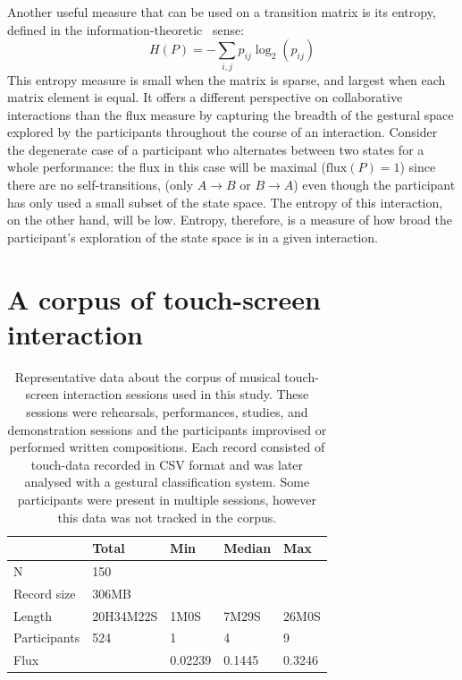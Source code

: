 \documentclass{sigchi}
\begin{document}
Another useful measure that can be used on a transition matrix is its
entropy, defined in the information-theoretic~\cite{Shannon:1948rt}
sense:
\begin{equation}
  H(P) = -\sum_{i,j}p_{ij}\log_2(p_{ij})
\end{equation}
This entropy measure is small when the matrix is sparse, and largest
when each matrix element is equal. It offers a different perspective
on collaborative interactions than the flux measure by capturing the
breadth of the gestural space explored by the participants throughout
the course of an interaction. Consider the degenerate case of a
participant who alternates between two states for a whole performance:
the flux in this case will be maximal ($\mathrm{flux}(P) = 1$) since
there are no self-transitions, (only $A \rightarrow B$ or
$ B \rightarrow A$) even though the participant has only used a small
subset of the state space. The entropy of this interaction, on the
other hand, will be low. Entropy, therefore, is a measure of how broad
the participant's exploration of the state space is in a given
interaction.

\section{A corpus of touch-screen interaction}

\begin{table}
\begin{tabular}{l|llll}
\hline
            & Total & Min  & Median   & Max     \\ 
\hline
N           & 150       &         &        &  \\
Record size & 306MB     &         &        &   \\
Length      & 20H34M22S & 1M0S    & 7M29S  & 26M0S\\
Participants& 524       & 1       & 4      & 9    \\
Flux        &           & 0.02239 & 0.1445 & 0.3246\\
\hline
\end{tabular}
\caption{
  Representative data about the corpus of musical touch-screen
  interaction sessions used in this study. These sessions were
  rehearsals, performances, studies, and demonstration sessions and the
  participants improvised or performed written compositions. Each record
  consisted of touch-data recorded in CSV format and was later analysed
  with a gestural classification system. Some participants were
  present in multiple sessions, however this data was not tracked in
  the corpus.\label{corpus-table}}
\end{table}
\end{document}
